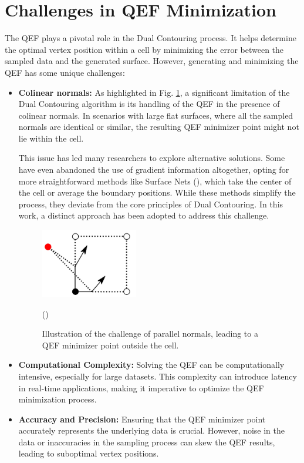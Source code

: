 \section{Challenges in QEF Minimization} \label{challanges-QEF-minimization}

The QEF plays a pivotal role in the Dual Contouring process. It helps determine the optimal vertex position within a cell by minimizing the error between the sampled data and the generated surface. However, generating and minimizing the QEF has some unique challenges:

\begin{itemize}
\item \textbf{Colinear normals:} 
As highlighted in Fig. \ref{fig:DC-colinear}, a significant limitation of the Dual Contouring algorithm is its handling of the QEF in the presence of colinear normals. In scenarios with large flat surfaces, where all the sampled normals are identical or similar, the resulting QEF minimizer point might not lie within the cell. 
    
This issue has led many researchers to explore alternative solutions. Some have even abandoned the use of gradient information altogether, opting for more straightforward methods like Surface Nets (\cite{Gibson_1998}), which take the center of the cell or average the boundary positions. While these methods simplify the process, they deviate from the core principles of Dual Contouring. In this work, a distinct approach has been adopted to address this challenge.

\begin{figure}[h]
    \centering
    \includegraphics[width=0.4\textwidth]{Figures/DC-colinear.jpg}
    \decoRule
    \caption{Illustration of the challenge of parallel normals, leading to a QEF minimizer point outside the cell.}(\cite{Boristhebrave_2018})
    \label{fig:DC-colinear}
\end{figure}

\item \textbf{Computational Complexity:} Solving the QEF can be computationally intensive, especially for large datasets. This complexity can introduce latency in real-time applications, making it imperative to optimize the QEF minimization process.

\item \textbf{Accuracy and Precision:} Ensuring that the QEF minimizer point accurately represents the underlying data is crucial. However, noise in the data or inaccuracies in the sampling process can skew the QEF results, leading to suboptimal vertex positions.
\end{itemize}

